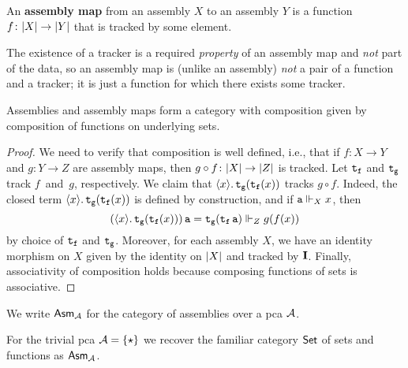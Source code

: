 \begin{definition}
  An \textbf{assembly map} from an assembly \(X\) to an assembly \(Y\) is a
  function \(f \colon \carrier{X} \to \carrier{Y}\) that is tracked by some
  element.
\end{definition}

The existence of a tracker is a required \emph{property} of an assembly map and
\emph{not} part of the data, so an assembly map is (unlike an assembly)
\emph{not} a pair of a function and a tracker; it is just a function for which
there exists some tracker.

\begin{proposition}
  Assemblies and assembly maps form a category with composition given
  by composition of functions on underlying sets.
\end{proposition}
\begin{proof}
  We need to verify that composition is well defined, i.e., that if
  \(f \colon X \to Y\) and \(g \colon Y \to Z\) are assembly maps, then
  \(g \circ f \colon \carrier{X} \to \carrier{Z}\) is tracked.
  Let \(\pca{t_f}\) and \(\pca{t_g}\) track \(f\)~and~\(g\), respectively.  We
  claim that \(\lambdapca{x}{\pca{t_g}(\pca{t_f}(x))}\) tracks \(g \circ
  f\). Indeed, the closed term \(\lambdapca{x}{\pca{t_g}(\pca{t_f}(x))}\) is
  defined by construction, and if \(\pca{a} \realizes_X x\), then
  \[
    {(\lambdapca{x}{\pca{t_g}(\pca{t_f}(x)}))\pca{a} =
    \pca{t_g}(\pca{t_f}\pca{a})} \realizes_Z g(f(x))
  \]
  by choice of \(\pca{t_f}\) and \(\pca{t_g}\).
  Moreover, for each assembly \(X\), we have an identity morphism on \(X\) given
  by the identity on \(\carrier{X}\) and tracked by \(\icomb\).
  Finally, associativity of composition holds because composing functions of
  sets is associative.
\end{proof}

\begin{notation}[\(\Asm{\AA}\)]
  We write \(\Asm{\AA}\) for the category of assemblies over a pca \(\AA\).
\end{notation}

\begin{example}
  For the trivial pca \(\AA = \set{\singleton}\) we recover the familiar
  category \(\Set\) of sets and functions as \(\Asm{\AA}\).
\end{example}


